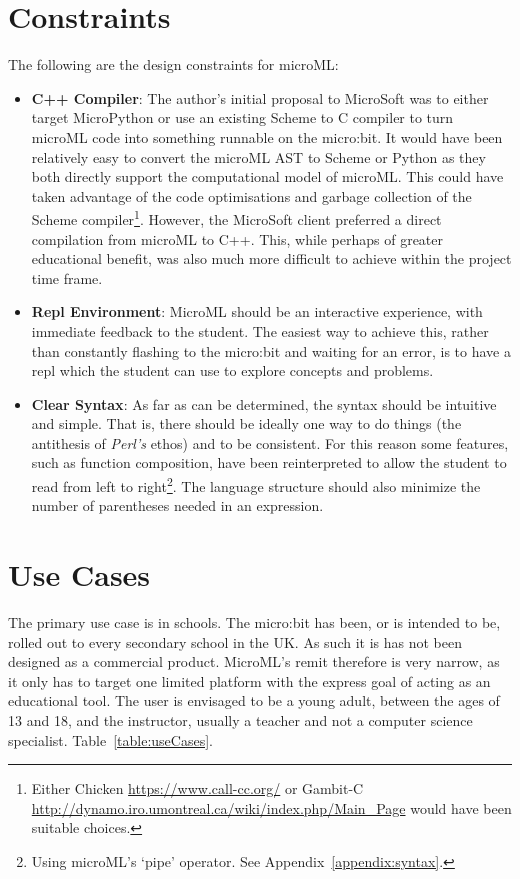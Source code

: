 \documentclass[12pt, a4paper]{report}
\begin{document}
\section{Constraints}
\label{constraints}
The following are the design constraints for microML\@:
\begin{itemize}
    \item \textbf{C++ Compiler}\@: The author's initial proposal to MicroSoft was to either target MicroPython
        or use an existing Scheme
        to C compiler to turn microML code into something runnable on the micro:bit. It would have
        been relatively easy to convert the microML AST to Scheme or Python as they both directly support the
        computational model of microML\@. This could have taken advantage of
        the code optimisations and garbage collection of the Scheme compiler\footnote{Either Chicken
        \url{https://www.call-cc.org/} or Gambit-C \url{http://dynamo.iro.umontreal.ca/wiki/index.php/Main_Page}
        would have been suitable choices.}. However, the MicroSoft client preferred a direct
        compilation from microML to C++. This, while perhaps of greater educational benefit, was also
        much more difficult to achieve within the project time frame.
    \item \textbf{Repl Environment}\@: MicroML should be an interactive experience, with immediate feedback to
        the student. The easiest way to achieve this, rather than constantly flashing to the
        micro:bit and waiting for an error, is to have a repl which the student can use to explore
        concepts and problems. 
    \item \textbf{Clear Syntax}\@: As far as can be determined, the syntax should be intuitive and simple. That
        is, there should be ideally one way to do things (the antithesis of \textit{Perl's} ethos)
        and to be consistent. For this reason some features, such as function composition, have been
        reinterpreted to allow the student to read from left to right\footnote{Using microML's
        `pipe' operator. See Appendix~\ref{appendix:syntax}.}. The language structure should also
        minimize the number of parentheses needed in an expression.
\end{itemize}

\section{Use Cases}
The primary use case is in schools. The micro:bit has been, or is intended to be, rolled out to
every secondary school in the UK\@. As such it is has not been designed as a commercial product.
MicroML's remit therefore is very narrow, as it only has to target one limited platform with the
express goal of acting as an educational tool. The user is envisaged to be a young adult, between
the ages of 13 and 18, and the instructor, usually a teacher and not a computer science specialist.
Table~\ref{table:useCases}.
\end{document}
